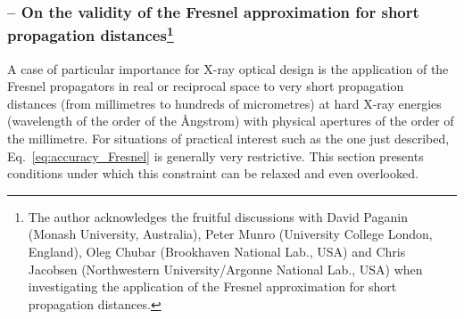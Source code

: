 \begin{refsection}
\subsubsection*{-- On the validity of the Fresnel approximation for short propagation distances\footnote{The author acknowledges the fruitful discussions with David Paganin (Monash University, Australia), Peter Munro (University College London, England), Oleg Chubar (Brookhaven National Lab., USA) and Chris Jacobsen (Northwestern University/Argonne National Lab., USA) when investigating the application of the Fresnel approximation for short propagation distances.}}

A case of particular importance for X-ray optical design is the application of the Fresnel propagators in real or reciprocal space to very short propagation distances (from millimetres to hundreds of micrometres) at hard X-ray energies (wavelength of the order of the \r{A}ngstrom) with physical apertures of the order of the millimetre. For situations of practical interest such as the one just described, Eq.~\ref{eq:accuracy_Fresnel} is generally very restrictive. This section presents conditions under which this constraint can be relaxed and even overlooked. 


\end{refsection}
